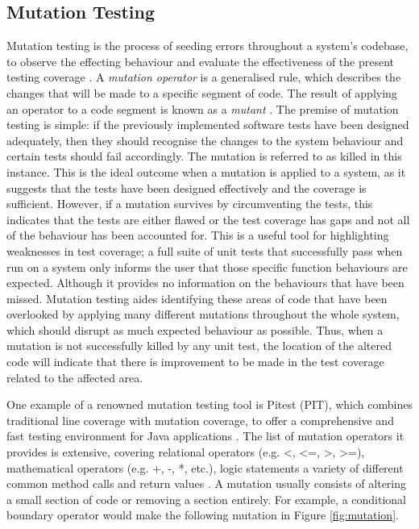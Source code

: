 \documentclass[a4paper,12pt]{article}
\begin{document}
\subsection{Mutation Testing}
Mutation testing is the process of seeding errors throughout a system’s codebase, to observe the effecting behaviour and evaluate the effectiveness of the present testing coverage \citep{adrion81}. A \textit{mutation operator} is a generalised rule, which describes the changes that will be made to a specific segment of code. The result of applying an operator to a code segment is known as a \textit{mutant} \citep{ammann17}. The premise of mutation testing is simple: if the previously implemented software tests have been designed adequately, then they should recognise the changes to the system behaviour and certain tests should fail accordingly. The mutation is referred to as killed in this instance. This is the ideal outcome when a mutation is applied to a system, as it suggests that the tests have been designed effectively and the coverage is sufficient. However, if a mutation survives by circumventing the tests, this indicates that the tests are either flawed or the test coverage has gaps and not all of the behaviour has been accounted for. This is a useful tool for highlighting weaknesses in test coverage; a full suite of unit tests that successfully pass when run on a system only informs the user that those specific function behaviours are expected. Although it provides no information on the behaviours that have been missed. Mutation testing aides identifying these areas of code that have been overlooked by applying many different mutations throughout the whole system, which should disrupt as much expected behaviour as possible. Thus, when a mutation is not successfully killed by any unit test, the location of the altered code will indicate that there is improvement to be made in the test coverage related to the affected area.

One example of a renowned mutation testing tool is Pitest (PIT), which combines traditional line coverage with mutation coverage, to offer a comprehensive and fast testing environment for Java applications \citep{pit19}. The list of mutation operators it provides is extensive, covering relational operators (e.g. \textless, \textless=, \textgreater, \textgreater=), mathematical operators (e.g. +, -, *, etc.), logic statements a variety of different common method calls and return values \citep{pit19}. A mutation usually consists of altering a small section of code or removing a section entirely. For example, a conditional boundary operator would make the following mutation  in Figure \ref{fig:mutation}. 
\end{document}
